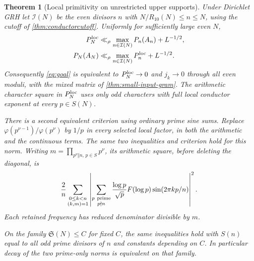 \documentclass[11pt,a4paper]{article}
\numberwithin{equation}{section}
\newtheorem{theorem}{Theorem}[section]
\newcommand{\SSS}{\mathfrak S}
\begin{document}
\begin{theorem}[Local primitivity on unrestricted upper supports]
\label{thm:physical-primitivity}
Under Dirichlet GRH let $\mathcal I(N)$ be the even divisors $n$
with $N/R_{10}(N)\le n\le N$, using the cutoff of
\cref{thm:conductorcutoff}. Uniformly for sufficiently large even $N$,
\begin{align*}
 P_N^{\rm loc}
   &\ll_\rho \max_{n\in\mathcal I(N)} P_n(A_n)+L^{-1/2},\\
 P_N(A_N)
   &\ll_\rho \max_{n\in\mathcal I(N)} P_n^{\rm loc}+L^{-1/2}.
\end{align*}
Consequently \eqref{eq:goal} is equivalent to $P_N^{\rm loc}\to0$
and $j_k\to0$ through all even moduli, with the mixed matrix of
\cref{thm:small-input-gram}. The arithmetic character square in
$P_N^{\rm loc}$ uses only odd characters with full local conductor
exponent at every $p\in S(N)$.

There is a second equivalent criterion using ordinary prime sine
sums. Replace $\varphi(p^{\nu-1})/\varphi(p^\nu)$ by $1/p$ in
every selected local factor, in both the arithmetic and the
continuous terms. The same two inequalities and criterion hold
for this norm. Writing $m=\prod_{p^\nu\Vert n,\,p\in S}p^\nu$,
its arithmetic square, before deleting the diagonal, is
\begin{equation}
 \frac2n\sum_{\substack{0\le k<n\\(k,m)=1}}
 \left|\sum_{\substack{p\ {\rm prime}\\p\nmid n}}
       \frac{\log p}{\sqrt p}F(\log p)\sin(2\pi kp/n)\right|^2 .
 \label{eq:physical-primitive-sines}
\end{equation}
Each retained frequency has reduced denominator divisible by $m$.

On the family $\SSS(N)\le C$ for fixed $C$, the same inequalities
hold with $S(n)$ equal to \emph{all} odd prime divisors of $n$
and constants depending on $C$. In particular decay of the two
prime-only norms is equivalent on that family.
\end{theorem}
\end{document}
